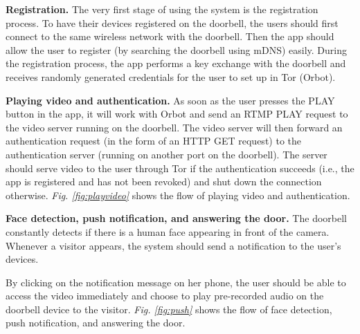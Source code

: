 \textbf{Registration.} The very first stage of using the system is the registration process. To have their devices registered on the doorbell, the users should first connect to the same wireless network with the doorbell. Then the app should allow the user to register (by searching the doorbell using mDNS) easily. During the registration process, the app performs a key exchange with the doorbell and receives randomly generated credentials for the user to set up in Tor (Orbot). 

\textbf{Playing video and authentication.} As soon as the user presses the PLAY button in the app, it will work with Orbot and send an RTMP PLAY request to the video server running on the doorbell. The video server will then forward an authentication request (in the form of an HTTP GET request) to the authentication server (running on another port on the doorbell). The server should serve video to the user through Tor if the authentication succeeds (i.e., the app is registered and has not been revoked) and shut down the connection otherwise.
\textit{Fig. \ref{fig:playvideo}} shows the flow of playing video and authentication.

\textbf{Face detection, push notification, and answering the door.} The doorbell constantly detects if there is a human face appearing in front of the camera. Whenever a visitor appears, the system should send a notification to the user's devices.

By clicking on the notification message on her phone, the user should be able to access the video immediately and choose to play pre-recorded audio on the doorbell device to the visitor.
\textit{Fig. \ref{fig:push}} shows the flow of face detection, push notification, and answering the door.

